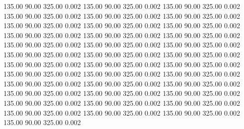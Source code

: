 135.00  90.00  325.00 0.002
135.00  90.00  325.00 0.002
135.00  90.00  325.00 0.002
135.00  90.00  325.00 0.002
135.00  90.00  325.00 0.002
135.00  90.00  325.00 0.002
135.00  90.00  325.00 0.002
135.00  90.00  325.00 0.002
135.00  90.00  325.00 0.002
135.00  90.00  325.00 0.002
135.00  90.00  325.00 0.002
135.00  90.00  325.00 0.002
135.00  90.00  325.00 0.002
135.00  90.00  325.00 0.002
135.00  90.00  325.00 0.002
135.00  90.00  325.00 0.002
135.00  90.00  325.00 0.002
135.00  90.00  325.00 0.002
135.00  90.00  325.00 0.002
135.00  90.00  325.00 0.002
135.00  90.00  325.00 0.002
135.00  90.00  325.00 0.002
135.00  90.00  325.00 0.002
135.00  90.00  325.00 0.002
135.00  90.00  325.00 0.002
135.00  90.00  325.00 0.002
135.00  90.00  325.00 0.002
135.00  90.00  325.00 0.002
135.00  90.00  325.00 0.002
135.00  90.00  325.00 0.002
135.00  90.00  325.00 0.002
135.00  90.00  325.00 0.002
135.00  90.00  325.00 0.002
135.00  90.00  325.00 0.002
135.00  90.00  325.00 0.002
135.00  90.00  325.00 0.002
135.00  90.00  325.00 0.002
